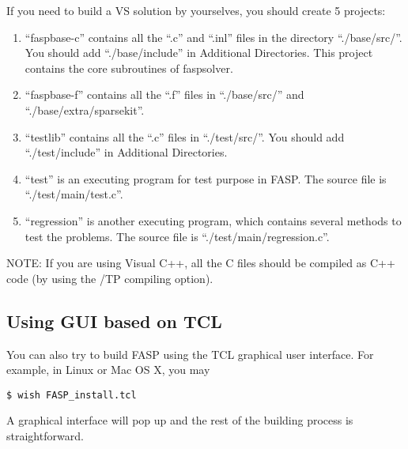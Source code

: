\documentclass[11pt]{memoir}
\begin{document}
If you need to build a VS solution by yourselves, you should create 5 projects:
\begin{enumerate}
\item ``faspbase-c'' contains all the ``.c'' and ``.inl'' files in the directory ``./base/src/''. You should add ``./base/include'' in Additional Directories. This project contains the core subroutines of faspsolver. 
\item ``faspbase-f'' contains all the ``.f'' files in ``./base/src/'' and ``./base/extra/sparsekit''. 
\item ``testlib'' contains all the ``.c'' files in ``./test/src/''. You should add ``./test/include'' in Additional Directories.
\item ``test'' is an executing program for test purpose in FASP. The source file is ``./test/main/test.c''.
\item ``regression'' is another executing program, which contains several methods to test the problems. The source file is ``./test/main/regression.c''.
\end{enumerate}

\begin{snugshade}\noindent
NOTE: If you are using Visual C++, all the C files should be compiled as C++ code (by using the /TP compiling option).
\end{snugshade}


\subsection{Using GUI based on TCL}
You can also try to build FASP using the TCL graphical user interface. For example, in Linux or Mac OS X, you may 
%
\begin{lstlisting}[numbers=none]
$ wish FASP_install.tcl
\end{lstlisting}
%
A graphical interface will pop up and the rest of the building process is straightforward. 
\end{document}
